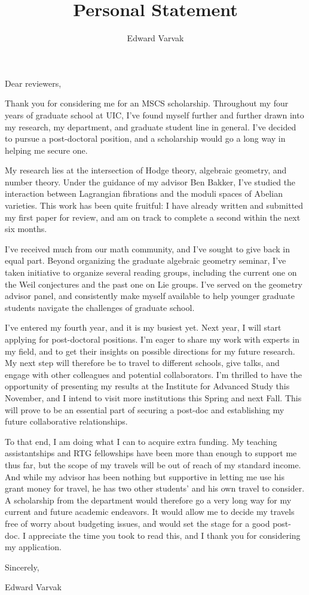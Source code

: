 \documentclass[12pt]{amsart}
\title{Personal Statement}
\author{Edward Varvak}
\begin{document}
\maketitle
\noindent Dear reviewers, \newline

Thank you for considering me for an MSCS scholarship. Throughout my four years of 
graduate school at UIC, I've found myself further and further drawn into my research, 
my department, and graduate student line in general. I've decided to pursue a
post-doctoral position, and a scholarship would go a long way in helping me secure one.

My research lies at the intersection of Hodge theory, algebraic geometry, and number 
theory. Under the guidance of my advisor Ben Bakker, I've studied the interaction 
between Lagrangian fibrations and the moduli spaces of Abelian varieties. This work 
has been quite fruitful: I have already written and submitted my first paper for review,
and am on track to complete a second within the next six months. 

I've received much from our math community, and I've sought to give back in equal part.
Beyond organizing the graduate algebraic geometry seminar, I've taken 
initiative to organize several reading groups, including the current one on the Weil 
conjectures and the past one on Lie groups. I've served on the geometry advisor panel,
and consistently make myself available to help younger graduate students navigate 
the challenges of graduate school. 

I've entered my fourth year, and it is my busiest yet. Next year, I will start applying
for post-doctoral positions. I'm eager to share my work with experts in my field, and 
to get their insights on possible directions for my future research. My next step will 
therefore be to travel to different schools, give talks, and engage with other colleagues 
and potential collaborators. I'm thrilled to have the opportunity of presenting my results
at the Institute for Advanced Study this November, and I intend to visit more institutions
this Spring and next Fall. This will prove to be an essential part of securing a post-doc 
and establishing my future collaborative relationships.

To that end, I am doing what I can to acquire extra funding. My teaching assistantships 
and RTG fellowships have been more than enough to support me thus far, but the scope of 
my travels will be out of reach of my standard income. And while my advisor
has been nothing but supportive in letting me use his grant money for travel, he has two
other students' and his own travel to consider. A scholarship from the department would
therefore go a very long way for my current and future academic endeavors. It would allow 
me to decide my travels free of worry about budgeting issues, and would set the stage 
for a good post-doc. I appreciate the time you took to read this, and I thank you for
considering my application.
\newline

\noindent Sincerely,
\newline

\noindent Edward Varvak
\end{document}
